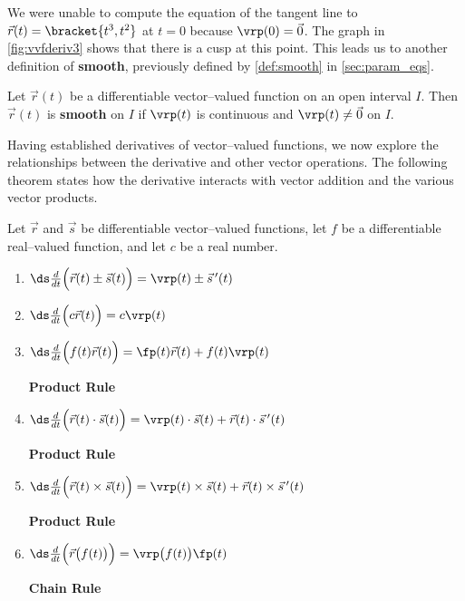 We were unable to compute the equation of the tangent line to $\vec r(t)=\bracket{t^3,t^2}$ at $t=0$ because $\vrp(0) = \vec 0$. The graph in \autoref{fig:vvfderiv3} shows that there is a cusp at this point. This leads us to another definition of \textbf{smooth}, previously defined by \autoref{def:smooth} in \autoref{sec:param_eqs}.

{Let $\vec r(t)$ be a differentiable vector--valued function on an open interval $I$. Then $\vec r(t)$ is \textbf{smooth} on $I$ if $\vrp(t)$ is continuous and $\vrp(t)\neq \vec 0$ on $I$.
}

Having established derivatives of vector--valued functions, we now explore the relationships between the derivative and other vector operations. The following theorem states how the derivative interacts with vector addition and the various vector products.

{Let $\vec r$ and $\vec s$ be differentiable vector--valued functions, let $f$ be a differentiable real--valued function, and let $c$ be a real number.
\begin{enumerate}
	\item $\ds \frac{d}{dt}\Big(\vec r(t) \pm \vec s(t)\Big) = \vrp(t) \pm \vec s\,'(t)$
	\item $\ds \frac{d}{dt}\Big(c\vec r(t)\Big) = c\vrp(t)$
	\item \parbox{200pt}{$\ds \frac{d}{dt}\Big(f(t)\vec r(t)\Big) = \fp(t)\vec r(t) + f(t)\vrp(t)$} \textbf{Product Rule}
	\item \parbox{200pt}{$\ds \frac{d}{dt}\Big(\vec r(t)\cdot \vec s(t) \Big) = \vrp(t)\cdot \vec s(t) + \vec r(t)\cdot \vec s\,'(t)$} \textbf{Product Rule}
	\item\label{crossprodrule} \parbox{200pt}{$\ds \frac{d}{dt}\Big(\vec r(t)\times \vec s(t) \Big) = \vrp(t)\times \vec s(t) + \vec r(t)\times \vec s\,'(t)$} \textbf{Product Rule}
	\item \parbox{200pt}{$\ds \frac{d}{dt}\Big(\vec r\big(f(t)\big)\Big) = \vrp\big(f(t)\big)\fp(t)$}  \textbf{Chain Rule}
\end{enumerate}}

